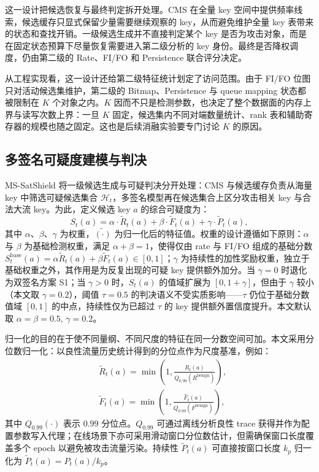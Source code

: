 这一设计把候选恢复与最终判定拆开处理。CMS 在全量 key 空间中提供频率线索，候选缓存只显式保留少量需要继续观察的 key，从而避免维护全量 key 表带来的状态和查找开销。一级候选生成并不直接判定某个 key 是否为攻击对象，而是在固定状态预算下尽量恢复需要进入第二级分析的 key 身份。最终是否降权调度，仍由第二级的 Rate、FI/FO 和 Persistence 联合评分决定。

从工程实现看，这一设计还给第二级特征统计划定了访问范围。由于 FI/FO 位图只对活动候选集维护，第二级的 Bitmap、Persistence 与 queue mapping 状态都被限制在 $K$ 个对象之内。$K$ 因而不只是检测参数，也决定了整个数据面的内存上界与读写次数上界：一旦 $K$ 固定，候选集内不同对端数量统计、rank 表和辅助寄存器的规模也随之固定。这也是后续消融实验要专门讨论 $K$ 的原因。

\subsection{多签名可疑度建模与判决}
\label{subsec:ch3_score}
MS-SatShield 将一级候选生成与可疑判决分开处理：CMS 与候选缓存负责从海量 key 中筛选可疑候选集合 $\mathcal{H}_t$，多签名模型再在候选集合上区分攻击相关 key 与合法大流 key。为此，定义候选 key $a$ 的综合可疑度为：
\begin{equation}
S_t(a)=\alpha \cdot \widetilde{R}_t(a) + \beta \cdot \widetilde{F}_t(a) + \gamma \cdot \widetilde{P}_t(a),
\label{eq:score_def}
\end{equation}
其中 $\alpha、\beta、\gamma$ 为权重，$\widetilde{(\cdot)}$ 为归一化后的特征值。权重的设计遵循如下原则：$\alpha$ 与 $\beta$ 为基础检测权重，满足 $\alpha+\beta=1$，使得仅由 rate 与 FI/FO 组成的基础分数 $S_t^{\text{base}}(a)=\alpha\widetilde{R}_t(a)+\beta\widetilde{F}_t(a)\in[0,1]$；$\gamma$ 为持续性的加性奖励权重，独立于基础权重之外，其作用是为反复出现的可疑 key 提供额外加分。当 $\gamma=0$ 时退化为双签名方案 S1；当 $\gamma>0$ 时，$S_t(a)$ 的值域扩展为 $[0,1+\gamma]$，但由于 $\gamma$ 较小（本文取 $\gamma=0.2$），阈值 $\tau=0.5$ 的判决语义不受实质影响——$\tau$ 仍位于基础分数值域 $[0,1]$ 的中点，持续性仅为已超过 $\tau$ 的 key 提供额外置信度提升。本文默认取 $\alpha=\beta=0.5$, $\gamma=0.2$。

归一化的目的在于使不同量纲、不同尺度的特征在同一分数空间可加。本文采用分位数归一化：以良性流量历史统计得到的分位点作为尺度基准，例如：
\begin{subequations}\label{eq:norm_def}
\begin{align}
&\widetilde{R}_t(a) = \min\left(1,\frac{R_t(a)}{Q_{0.99}(R^{\text{benign}})}\right),
\label{eq:norm_def_rate}\\[0.35em]
&\widetilde{F}_t(a) = \min\left(1,\frac{\widehat{F}_t(a)}{Q_{0.99}(F^{\text{benign}})}\right),
\label{eq:norm_def_fan}
\end{align}
\end{subequations}
其中 $Q_{0.99}(\cdot)$ 表示 $0.99$ 分位点。$Q_{0.99}$ 可通过离线分析良性 trace 获得并作为配置参数写入代理；在线场景下亦可采用滑动窗口分位数估计，但需确保窗口长度覆盖多个 epoch 以避免被攻击流量污染。持续性 $\widetilde{P}_t(a)$ 可直接按窗口长度 $k_p$ 归一化为 $\widetilde{P}_t(a)=P_t(a)/k_p$。

